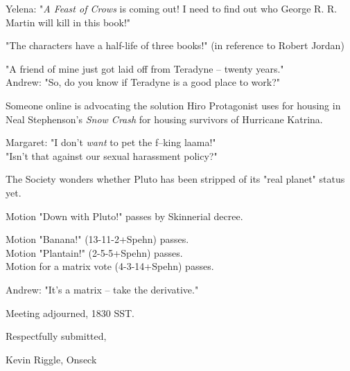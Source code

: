 \documentclass[10pt]{article}
\begin{document}
Yelena: "\emph{A Feast of Crows} is coming out!  I need to find out who George R. R. Martin will
kill in this book!"

"The characters have a half-life of three books!"  (in reference to Robert Jordan)

"A friend of mine just got laid off from Teradyne -- twenty years."\\
Andrew: "So, do you know if Teradyne is a good place to work?"

Someone online is advocating the solution Hiro Protagonist uses for housing in Neal Stephenson's 
\emph{Snow Crash} for housing survivors of Hurricane Katrina.

Margaret: "I don't \emph{want} to pet the f--king laama!"\\
"Isn't that against our sexual harassment policy?"

The Society wonders whether Pluto has been stripped of its "real planet" status yet.

Motion "Down with Pluto!" passes by Skinnerial decree.

Motion "Banana!" (13-11-2+Spehn) passes.\\
Motion "Plantain!" (2-5-5+Spehn) passes.\\
Motion for a matrix vote (4-3-14+Spehn) passes.

Andrew: "It's a matrix -- take the derivative."

\vspace{12pt}

\noindent
Meeting adjourned, 1830 SST.

\vspace{18pt}

\centerline{Respectfully submitted,}
\centerline{Kevin Riggle, Onseck}
\end{document}
